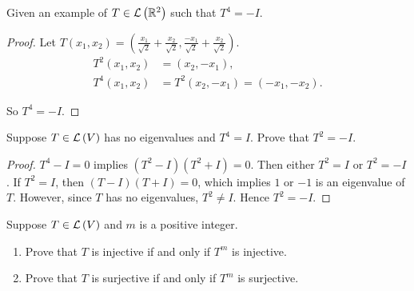 \begin{exercise}
    Given an example of $T\in\mathcal{L}\left({\mathbb{R}^{2}}\right)$ such that $T^{4} = -I$.
\end{exercise}

\begin{proof}
    Let $T(x_{1}, x_{2}) = \left(\frac{x_{1}}{\sqrt{2}} + \frac{x_{2}}{\sqrt{2}}, \frac{-x_{1}}{\sqrt{2}} + \frac{x_{2}}{\sqrt{2}}\right)$.
    \begin{align*}
        T^{2}(x_{1}, x_{2}) & = (x_{2}, -x_{1}),                         \\
        T^{4}(x_{1}, x_{2}) & = T^{2}(x_{2}, -x_{1}) = (-x_{1}, -x_{2}).
    \end{align*}

    So $T^{4} = -I$.
\end{proof}
\newpage

\begin{exercise}
    Suppose $T\in\mathcal{L}\left({V}\right)$ has no eigenvalues and $T^{4} = I$. Prove that $T^{2} = -I$.
\end{exercise}

\begin{proof}
    $T^{4} - I = 0$ implies $(T^{2} - I)(T^{2} + I) = 0$. Then either $T^{2} = I$ or $T^{2} = -I$. If $T^{2} = I$, then $(T - I)(T + I) = 0$, which implies $1$ or $-1$ is an eigenvalue of $T$. However, since $T$ has no eigenvalues, $T^{2}\ne I$. Hence $T^{2} = -I$.
\end{proof}
\newpage

\begin{exercise}
    Suppose $T\in\mathcal{L}\left({V}\right)$ and $m$ is a positive integer.
    \begin{enumerate}[label={(\alph*)}]
        \item Prove that $T$ is injective if and only if $T^{m}$ is injective.
        \item Prove that $T$ is surjective if and only if $T^{m}$ is surjective.
    \end{enumerate}
\end{exercise}


